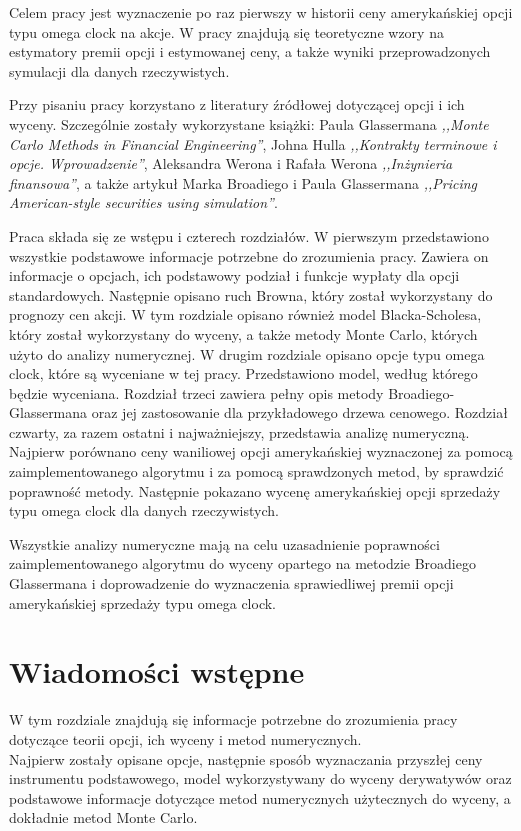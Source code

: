 \documentclass[]{pwr_wmat_praca_dyplomowa}
\theoremstyle{plain}
\numberwithin{theorem}{chapter}
\theoremstyle{definition}
\numberwithin{theorem}{chapter}
\begin{document}
Celem pracy jest wyznaczenie po raz pierwszy w historii ceny amerykańskiej opcji typu omega clock na akcje. W pracy znajdują się teoretyczne wzory na estymatory premii opcji i estymowanej ceny, a także wyniki przeprowadzonych symulacji dla danych rzeczywistych.

Przy pisaniu pracy korzystano z literatury źródłowej dotyczącej opcji i ich wyceny. Szczególnie zostały wykorzystane książki: Paula Glassermana \textit{,,Monte Carlo Methods in Financial Engineering''}, Johna Hulla \textit{,,Kontrakty terminowe i opcje. Wprowadzenie''}, Aleksandra Werona i Rafała Werona \textit{,,Inżynieria finansowa''}, a także artykuł Marka Broadiego i Paula Glassermana \textit{,,Pricing American-style securities using simulation''}.

Praca składa się ze wstępu i czterech rozdziałów. W pierwszym przedstawiono wszystkie podstawowe informacje potrzebne do zrozumienia pracy. Zawiera on informacje o opcjach, ich podstawowy podział i funkcje wypłaty dla opcji standardowych. Następnie opisano ruch Browna, który został wykorzystany do prognozy cen akcji. W tym rozdziale opisano również model Blacka-Scholesa, który został wykorzystany do wyceny, a także metody Monte Carlo, których użyto do analizy numerycznej. W drugim rozdziale opisano opcje typu omega clock, które są wyceniane w tej pracy. Przedstawiono model, według którego będzie wyceniana. Rozdział trzeci zawiera pełny opis metody Broadiego-Glassermana oraz jej zastosowanie dla przykładowego drzewa cenowego. Rozdział czwarty, za razem ostatni i najważniejszy, przedstawia analizę numeryczną. Najpierw porównano ceny waniliowej opcji amerykańskiej wyznaczonej za pomocą zaimplementowanego algorytmu i za pomocą sprawdzonych metod, by sprawdzić poprawność metody. Następnie pokazano wycenę amerykańskiej opcji sprzedaży typu omega clock dla danych rzeczywistych.

Wszystkie analizy numeryczne mają na celu uzasadnienie poprawności zaimplementowanego algorytmu do wyceny opartego na metodzie Broadiego Glassermana i doprowadzenie do wyznaczenia sprawiedliwej premii opcji amerykańskiej sprzedaży typu omega clock.

\chapter{Wiadomości wstępne}
W tym rozdziale znajdują się informacje potrzebne do zrozumienia pracy dotyczące teorii opcji, ich wyceny i metod numerycznych.\\
Najpierw zostały opisane opcje, następnie sposób wyznaczania przyszłej ceny instrumentu podstawowego, model wykorzystywany do wyceny derywatywów oraz podstawowe informacje dotyczące metod numerycznych użytecznych do wyceny, a dokładnie metod Monte Carlo.
\end{document}
